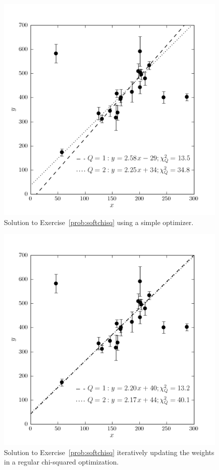 \documentclass[12pt,twoside]{article}
\newcommand{\problemname}{Exercise}
\newcounter{problem}
\begin{document}
\clearpage
\begin{figure}[H]
\includegraphics[]{ex7a.png}
\caption{Solution to \problemname~\ref{prob:softchisq} using a simple optimizer.}\label{fig:softchisqa}
\end{figure}
\clearpage
\begin{figure}[H]
\includegraphics[]{ex7b.png}
\caption{Solution to \problemname~\ref{prob:softchisq} iteratively updating the weights in a regular chi-squared optimization.}\label{fig:softchisqb}
\end{figure}
\end{document}
